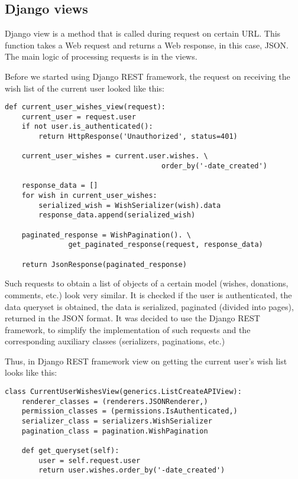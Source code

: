 \subsection{Django views}
Django view is a method that is called during request on certain \ac{URL}. This function takes a Web request and returns a Web response, in this case, JSON. The main logic of processing requests is in the views.

Before we started using Django REST framework, the request on receiving the wish list of the current user looked like this:
\begin{lstlisting}
def current_user_wishes_view(request):
    current_user = request.user
    if not user.is_authenticated():
        return HttpResponse('Unauthorized', status=401)

    current_user_wishes = current.user.wishes. \
                                     order_by('-date_created')

    response_data = []
    for wish in current_user_wishes:
        serialized_wish = WishSerializer(wish).data
        response_data.append(serialized_wish)

    paginated_response = WishPagination(). \
               get_paginated_response(request, response_data)

    return JsonResponse(paginated_response)

\end{lstlisting}
Such requests to obtain a list of objects of a certain model (wishes, donations, comments, etc.) look very similar. It is checked if the user is authenticated, the data queryset is obtained, the data is serialized, paginated (divided into pages), returned in the \ac{JSON} format. It was decided to use the Django REST framework, to simplify the implementation of such requests and the corresponding auxiliary classes (serializers, paginations, etc.)

Thus, in Django REST framework view on getting the current user's wish list looks like this:

\begin{lstlisting}
class CurrentUserWishesView(generics.ListCreateAPIView):
    renderer_classes = (renderers.JSONRenderer,)
    permission_classes = (permissions.IsAuthenticated,)
    serializer_class = serializers.WishSerializer
    pagination_class = pagination.WishPagination

    def get_queryset(self):
        user = self.request.user
        return user.wishes.order_by('-date_created')
\end{lstlisting}

